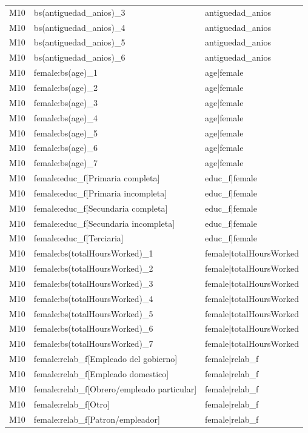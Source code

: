 \begin{longtable}{lll}
M10 & bs(antiguedad\_anios)\_3 & antiguedad\_anios \\
M10 & bs(antiguedad\_anios)\_4 & antiguedad\_anios \\
M10 & bs(antiguedad\_anios)\_5 & antiguedad\_anios \\
M10 & bs(antiguedad\_anios)\_6 & antiguedad\_anios \\
M10 & female:bs(age)\_1 & age|female \\
M10 & female:bs(age)\_2 & age|female \\
M10 & female:bs(age)\_3 & age|female \\
M10 & female:bs(age)\_4 & age|female \\
M10 & female:bs(age)\_5 & age|female \\
M10 & female:bs(age)\_6 & age|female \\
M10 & female:bs(age)\_7 & age|female \\
M10 & female:educ\_f[Primaria completa] & educ\_f|female \\
M10 & female:educ\_f[Primaria incompleta] & educ\_f|female \\
M10 & female:educ\_f[Secundaria completa] & educ\_f|female \\
M10 & female:educ\_f[Secundaria incompleta] & educ\_f|female \\
M10 & female:educ\_f[Terciaria] & educ\_f|female \\
M10 & female:bs(totalHoursWorked)\_1 & female|totalHoursWorked \\
M10 & female:bs(totalHoursWorked)\_2 & female|totalHoursWorked \\
M10 & female:bs(totalHoursWorked)\_3 & female|totalHoursWorked \\
M10 & female:bs(totalHoursWorked)\_4 & female|totalHoursWorked \\
M10 & female:bs(totalHoursWorked)\_5 & female|totalHoursWorked \\
M10 & female:bs(totalHoursWorked)\_6 & female|totalHoursWorked \\
M10 & female:bs(totalHoursWorked)\_7 & female|totalHoursWorked \\
M10 & female:relab\_f[Empleado del gobierno] & female|relab\_f \\
M10 & female:relab\_f[Empleado domestico] & female|relab\_f \\
M10 & female:relab\_f[Obrero/empleado particular] & female|relab\_f \\
M10 & female:relab\_f[Otro] & female|relab\_f \\
M10 & female:relab\_f[Patron/empleador] & female|relab\_f \\

\end{longtable}
